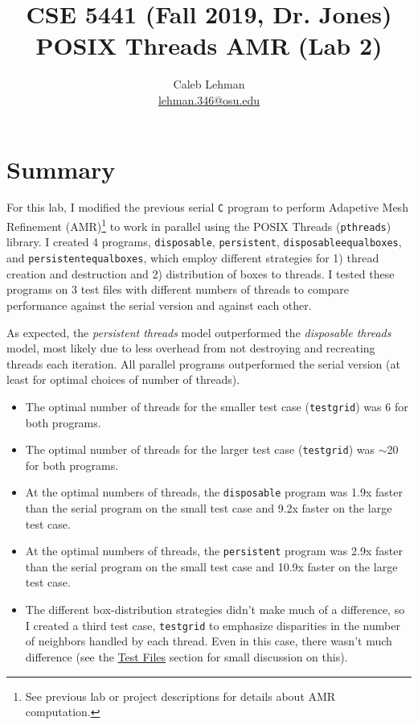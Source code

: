 \documentclass{article}
\title{
CSE 5441 (Fall 2019, Dr. Jones)\\
\large POSIX Threads AMR (Lab 2)
}
\author{
Caleb Lehman \\
\href{mailto:lehman.346@osu.edu}{lehman.346@osu.edu}
}
\begin{document}
\maketitle

\section*{Summary}
\label{sec:summary}

For this lab, I modified the previous serial \texttt{C} program to perform
Adapetive Mesh Refinement (AMR)\footnote{See previous lab or project
descriptions for details about AMR computation.} to work in parallel using the
POSIX Threads (\texttt{pthreads}) library. I created 4 programs,
\texttt{disposable}, \texttt{persistent}, \texttt{disposable\textunderscore equal\textunderscore boxes}, and
\texttt{persistent\textunderscore equal\textunderscore boxes}, which employ different strategies for 1)
thread creation and destruction and 2) distribution of boxes to threads. I
tested these programs on 3 test files with different numbers of threads to
compare performance against the serial version and against each other.
\label{subsec:results-summary}

As expected, the \emph{persistent threads} model outperformed the
\emph{disposable threads} model, most likely due to less overhead from not
destroying and recreating threads each iteration. All parallel programs
outperformed the serial version (at least for optimal choices of number of
threads).

\begin{itemize}

    \item The optimal number of threads for the smaller test case
    (\texttt{testgrid}) was 6 for both
    programs.

    \item The optimal number of threads for the larger test case
    (\texttt{testgrid}) was $\sim$20
    for both programs.
    
    \item At the optimal numbers of threads, the \texttt{disposable} program
    was 1.9x faster than the serial program on the small test case and 9.2x
    faster on the large test case.

    \item At the optimal numbers of threads, the \texttt{persistent} program
    was 2.9x faster than the serial program on the small test case and 10.9x
    faster on the large test case.

    \item The different box-distribution strategies didn't make much of a
    difference, so I created a third test case, \texttt{testgrid} to emphasize disparities in the number of
    neighbors handled by each thread. Even in this case, there wasn't much
    difference (see the \hyperref[subsec:test_files]{Test Files} section for
    small discussion on this).

\end{itemize}
\end{document}
